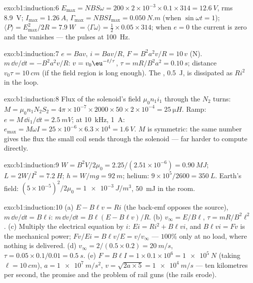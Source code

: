 \begin{solution}{exo:b1:induction:6}
$E_{\max} = NBS\omega = 200 \times 2 \times 10^{-3} \times 0.1 \times 314 = \qty{12.6}{V}$, rms
\qty{8.9}{V}; $I_{\max} = \qty{1.26}{A}$, $\Gamma_{\max} = NBSI_{\max} = \qty{0.050}{N.m}$
(when $\sin\omega t = 1$); $\langle P\rangle = E_{\max}^2/2R = \qty{7.9}{W}$ $=
\langle\Gamma\omega\rangle = \tfrac12 \times 0.05 \times 314$; when $e = 0$ the current is
zero and the  vanishes --- the  pulses at \qty{100}{Hz}.
\end{solution}

\begin{solution}{exo:b1:induction:7}
$e = Bav$, $i = Bav/R$, $F = B^2a^2v/R = 10\,v$ (N). $m\,\dd v/\dd t = -B^2a^2v/R$:
$v = v_0\eu^{-t/\tau}$, $\tau = mR/B^2a^2 = \qty{0.10}{s}$; distance $v_0\tau =
\qty{10}{cm}$ (if the field region is long enough). The ,
\qty{0.5}{J}, is dissipated as $Ri^2$ in the loop.
\end{solution}

\begin{solution}{exo:b1:induction:8}
Flux of the solenoid's field $\mu_0n_1i_1$ through the $N_2$ turns: $M =
\mu_0n_1N_2S_2 = 4\pi \times 10^{-7} \times 2000 \times 50 \times 2 \times 10^{-4} = \qty{25}{\micro H}$.
Ramp: $e = M\,\dd i_1/\dd t = \qty{2.5}{mV}$; at \qty{10}{kHz}, \qty{1}{A}: $e_{\max} =
M\omega I = 25 \times 10^{-6} \times 6.3 \times 10^4 = \qty{1.6}{V}$. $M$ is symmetric:
the same number gives the flux the small coil sends through the
solenoid --- far harder to compute directly.
\end{solution}

\begin{solution}{exo:b1:induction:9}
$W = B^2V/2\mu_0 = 2.25/(2.51 \times 10^{-6}) = \qty{0.90}{MJ}$; $L = 2W/I^2 =
\qty{7.2}{H}$; $h = W/mg = \qty{92}{m}$; helium: $9 \times 10^5/2600 = \qty{350}{L}$.
Earth's field: $(5 \times 10^{-5})^2/2\mu_0 = \qty{1e-3}{J/m^3}$, \qty{50}{mJ} in
the room.
\end{solution}

\begin{solution}{exo:b1:induction:10}
(a) $E - B\ell v = Ri$ (the back-emf opposes the source), $m\,\dd v/\dd t =
B\ell i$: $m\,\dd v/\dd t = B\ell(E - B\ell v)/R$. (b) $v_\infty = E/B\ell$, $\tau =
mR/B^2\ell^2$. (c) Multiply the electrical equation by $i$: $Ei = Ri^2 +
B\ell vi$, and $B\ell vi = Fv$ is the mechanical power;  $Fv/Ei =
B\ell v/E = v/v_\infty$ --- $100\%$ only at no load, where nothing is
delivered. (d) $v_\infty = 2/(0.5 \times 0.2) = \qty{20}{m/s}$, $\tau = 0.05 \times
0.1/0.01 = \qty{0.5}{s}$. (e) $F = B\ell I = 1 \times 0.1 \times 10^6 = \qty{1e5}{N}$
(taking $\ell = \qty{10}{cm}$), $a = \qty{1e7}{m/s^2}$, $v = \sqrt{2a \times 5} =
\qty{1e4}{m/s}$ --- ten kilometres per second, the promise and the
problem of rail guns (the rails erode).
\end{solution}

